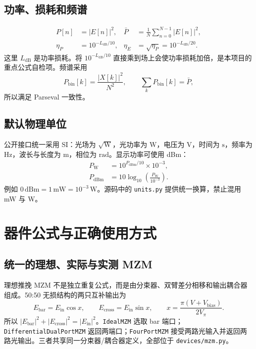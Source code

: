 \documentclass[11pt,a4paper,UTF8]{ctexart}
\newcommand{\pkg}[1]{\texttt{#1}}
\begin{document}
\subsection{功率、损耗和频谱}
\begin{align}
P[n]&=|E[n]|^2, &
\bar P&=\frac{1}{N}\sum_{n=0}^{N-1}|E[n]|^2,\\
\eta_P&=10^{-L_{\mathrm{dB}}/10}, &
\eta_E&=\sqrt{\eta_P}=10^{-L_{\mathrm{dB}}/20}.
\end{align}
这里 $L_{\mathrm{dB}}$ 是功率损耗。将 $10^{-L_{\mathrm{dB}}/10}$ 直接乘到场上会使功率损耗加倍，是本项目的重点公式自检项。频谱采用
\begin{equation}
P_{\mathrm{bin}}[k]=\frac{|X[k]|^2}{N^2},\qquad
\sum_kP_{\mathrm{bin}}[k]=\bar P,
\end{equation}
所以满足 Parseval 一致性。

\subsection{默认物理单位}
公开接口统一采用 SI：光场为 $\sqrt{\mathrm{W}}$，光功率为 $\mathrm{W}$，电压为 $\mathrm{V}$，时间为 $\mathrm{s}$，频率为 $\mathrm{Hz}$，波长与长度为 $\mathrm{m}$，相位为 $\mathrm{rad}$。显示功率可使用 dBm：
\begin{align}
P_{\mathrm{W}}&=10^{P_{\mathrm{dBm}}/10}\times10^{-3},\\
P_{\mathrm{dBm}}&=10\log_{10}\!\left(\frac{P_{\mathrm{W}}}{10^{-3}}\right).
\end{align}
例如 $0\,\mathrm{dBm}=1\,\mathrm{mW}=10^{-3}\,\mathrm{W}$。源码中的 \pkg{units.py} 提供统一换算，禁止混用 mW 与 W。

\section{器件公式与正确使用方式}
\subsection{统一的理想、实际与实测 MZM}
理想推挽 MZM 不是独立重复公式，而是由分束器、双臂差分相移和输出耦合器组成。50:50 无损结构的两只互补输出为
\begin{equation}
E_{\mathrm{bar}}=E_{\mathrm{in}}\cos x,\qquad
E_{\mathrm{cross}}=E_{\mathrm{in}}\sin x,\qquad
x=\frac{\pi(V+V_{\mathrm{bias}})}{2V_\pi}.
\end{equation}
所以 $|E_{\mathrm{bar}}|^2+|E_{\mathrm{cross}}|^2=|E_{\mathrm{in}}|^2$。\pkg{IdealMZM} 选取 bar 端口；\pkg{DifferentialDualPortMZM} 返回两端口；\pkg{FourPortMZM} 接受两路光输入并返回两路光输出。三者共享同一分束器/耦合器定义，全部位于 \pkg{devices/mzm.py}。
\end{document}
